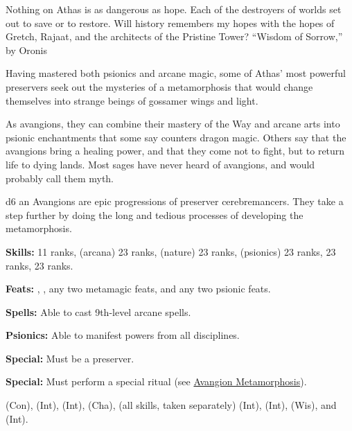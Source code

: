{Nothing on Athas is as dangerous as hope. Each of the destroyers of worlds set out to save or to restore. Will history remembers my hopes with the hopes of Gretch, Rajaat, and the architects of the Pristine Tower?}
{``Wisdom of Sorrow,'' by Oronis}
{
Having mastered both psionics and arcane magic, some of Athas' most powerful preservers seek out the mysteries of a metamorphosis that would change themselves into strange beings of gossamer wings and light.

As avangions, they can combine their mastery of the Way and arcane arts into psionic enchantments that some say counters dragon magic. Others say that the avangions bring a healing power, and that they come not to fight, but to return life to dying lands. Most sages have never heard of avangions, and would probably call them myth.
}
{d6}
{an}
{
Avangions are epic progressions of preserver cerebremancers. They take a step further by doing the long and tedious processes of developing the metamorphosis.
}
{
\textbf{Skills:}  11 ranks,  (arcana) 23 ranks,  (nature) 23 ranks,  (psionics) 23 ranks,  23 ranks,  23 ranks.

\textbf{Feats:} , , any two metamagic feats, and any two psionic feats.

\textbf{Spells:} Able to cast 9th-level arcane spells.

\textbf{Psionics:} Able to manifest powers from all disciplines.

\textbf{Special:} Must be a preserver.

\textbf{Special:} Must perform a special ritual (see \hyperref[Avangion Metamorphosis]{Avangion Metamorphosis}).
}
{
 (Con),  (Int),  (Int),  (Cha),  (all skills, taken separately) (Int),  (Int),  (Wis), and  (Int).
}
